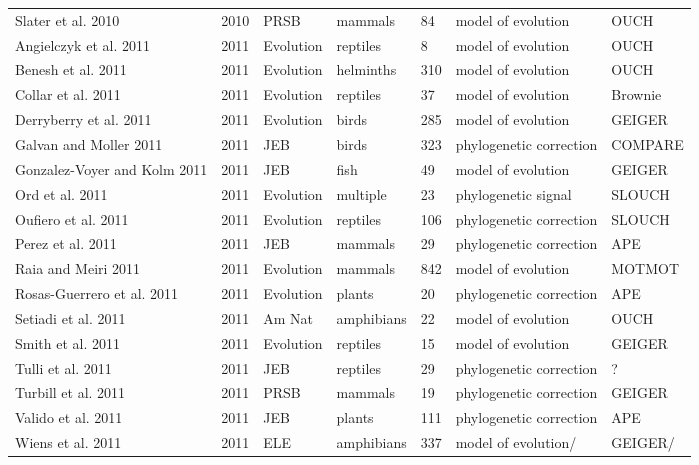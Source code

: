 \begin{landscape}
\begin{center}
\begin{longtable}{p{6cm}llllll}
Slater et al. 2010    &   2010    &   PRSB    &   mammals &   84  &   model of evolution  &   OUCH    \\
Angielczyk et al. 2011    &   2011    &   Evolution   &   reptiles    &   8   &   model of evolution  &   OUCH    \\
Benesh et al. 2011    &   2011    &   Evolution   &   helminths   &   310 &   model of evolution  &   OUCH    \\
Collar et al. 2011    &   2011    &   Evolution   &   reptiles    &   37  &   model of evolution  &   Brownie \\
Derryberry et al. 2011    &   2011    &   Evolution   &   birds   &   285 &   model of evolution  &   GEIGER  \\
Galvan and Moller 2011    &   2011    &   JEB &   birds   &   323 &   phylogenetic correction &   COMPARE \\
Gonzalez-Voyer and Kolm 2011  &   2011    &   JEB &   fish    &   49  &   model of evolution  &   GEIGER  \\
Ord et al. 2011   &   2011    &   Evolution   &   multiple    &   23  &   phylogenetic signal &   SLOUCH  \\
Oufiero et al. 2011   &   2011    &   Evolution   &   reptiles    &   106 &   phylogenetic correction &   SLOUCH  \\
Perez et al. 2011 &   2011    &   JEB &   mammals &   29  &   phylogenetic correction &   APE \\
Raia and Meiri 2011   &   2011    &   Evolution   &   mammals &   842 &   model of evolution  &   MOTMOT  \\
Rosas-Guerrero et al. 2011    &   2011    &   Evolution   &   plants  &   20  &   phylogenetic correction &   APE \\
Setiadi et al. 2011   &   2011    &   Am Nat  &   amphibians  &   22  &   model of evolution  &   OUCH    \\
Smith et al. 2011 &   2011    &   Evolution   &   reptiles    &   15  &   model of evolution  &   GEIGER  \\
Tulli et al. 2011 &   2011    &   JEB &   reptiles    &   29  &   phylogenetic correction &   ?   \\
Turbill et al. 2011   &   2011    &   PRSB    &   mammals &   19  &   phylogenetic correction &   GEIGER  \\
Valido et al. 2011    &   2011    &   JEB &   plants  &   111 &   phylogenetic correction &   APE \\
Wiens et al. 2011 &   2011    &   ELE &   amphibians  &   337 &   model of evolution/ &   GEIGER/ \\

\end{longtable}
\end{center}
\end{landscape}
